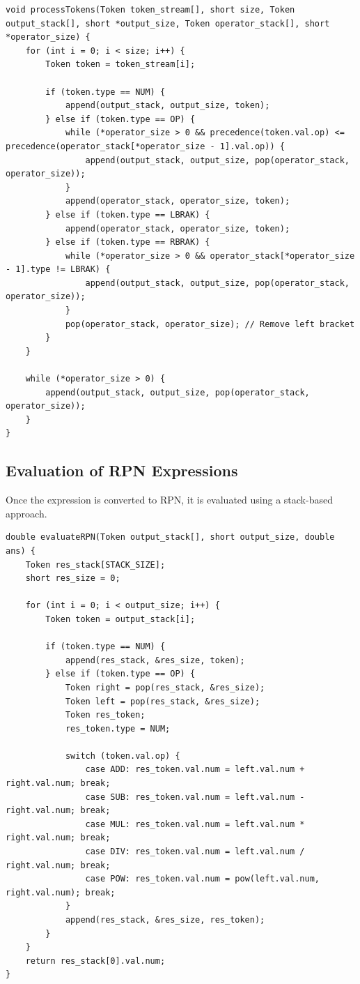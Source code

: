 \documentclass[journal]{IEEEtran}
\numberwithin{equation}{enumi}
\numberwithin{figure}{enumi}
\begin{document}
\begin{lstlisting}[caption=Shunting Yard Algorithm Implementation, label=lst:shuntingyard]
void processTokens(Token token_stream[], short size, Token output_stack[], short *output_size, Token operator_stack[], short *operator_size) {
    for (int i = 0; i < size; i++) {
        Token token = token_stream[i];
        
        if (token.type == NUM) {
            append(output_stack, output_size, token);
        } else if (token.type == OP) {
            while (*operator_size > 0 && precedence(token.val.op) <= precedence(operator_stack[*operator_size - 1].val.op)) {
                append(output_stack, output_size, pop(operator_stack, operator_size));
            }
            append(operator_stack, operator_size, token);
        } else if (token.type == LBRAK) {
            append(operator_stack, operator_size, token);
        } else if (token.type == RBRAK) {
            while (*operator_size > 0 && operator_stack[*operator_size - 1].type != LBRAK) {
                append(output_stack, output_size, pop(operator_stack, operator_size));
            }
            pop(operator_stack, operator_size); // Remove left bracket
        }
    }
    
    while (*operator_size > 0) {
        append(output_stack, output_size, pop(operator_stack, operator_size));
    }
}
\end{lstlisting}

\subsection{Evaluation of RPN Expressions}

Once the expression is converted to RPN, it is evaluated using a stack-based approach.

\begin{lstlisting}[caption=RPN Evaluation, label=lst:rpneval]
double evaluateRPN(Token output_stack[], short output_size, double ans) {
    Token res_stack[STACK_SIZE];
    short res_size = 0;
    
    for (int i = 0; i < output_size; i++) {
        Token token = output_stack[i];
        
        if (token.type == NUM) {
            append(res_stack, &res_size, token);
        } else if (token.type == OP) {
            Token right = pop(res_stack, &res_size);
            Token left = pop(res_stack, &res_size);
            Token res_token;
            res_token.type = NUM;
            
            switch (token.val.op) {
                case ADD: res_token.val.num = left.val.num + right.val.num; break;
                case SUB: res_token.val.num = left.val.num - right.val.num; break;
                case MUL: res_token.val.num = left.val.num * right.val.num; break;
                case DIV: res_token.val.num = left.val.num / right.val.num; break;
                case POW: res_token.val.num = pow(left.val.num, right.val.num); break;
            }
            append(res_stack, &res_size, res_token);
        }
    }
    return res_stack[0].val.num;
}
\end{lstlisting}
\end{document}
